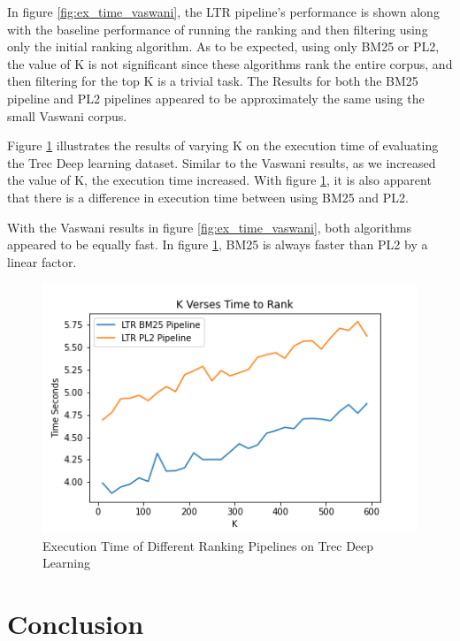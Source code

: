 \documentclass[letterpaper,12pt]{article}
\begin{document}
In figure \ref{fig:ex_time_vaswani}, the LTR pipeline's performance is shown along with the baseline performance of running the ranking and then filtering using only the initial ranking algorithm.
As to be expected, using only BM25 or PL2, the value of K is not significant since these algorithms rank the entire corpus, and then filtering for the top K is a trivial task.
The Results for both the BM25 pipeline and PL2 pipelines appeared to be approximately the same using the small Vaswani corpus.


Figure \ref{fig:ex_time_ms} illustrates the results of varying K on the execution time of evaluating the Trec Deep learning dataset.
Similar to the Vaswani results, as we increased the value of K, the execution time increased.
With figure \ref{fig:ex_time_ms}, it is also apparent that there is a difference in execution time between using BM25 and PL2.

With the Vaswani results in figure \ref{fig:ex_time_vaswani}, both algorithms appeared to be equally fast. In figure \ref{fig:ex_time_ms}, BM25 is always faster than PL2 by a linear factor.

\begin{figure}[h!]
    \centering  %
    \includegraphics[width=.81\textwidth]{K-Verses-Time-to-Rank.png} %
    \caption{Execution Time of Different Ranking Pipelines on Trec Deep Learning} %
    \label{fig:ex_time_ms} %
\end{figure}


\section{Conclusion}
\end{document}
